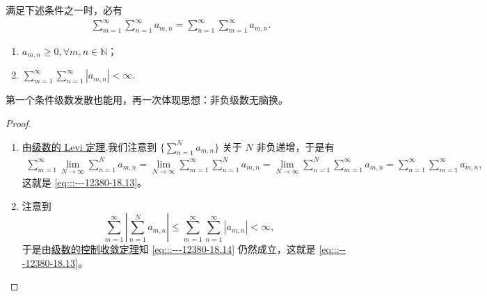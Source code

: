 \documentclass[../../main.tex]{subfiles}%
\begin{document}
\begin{theorem}[级数的Fubini定理]\label{theorem:级数的Fubini定理}满足下述条件之一时，必有
\begin{align}
\sum_{m = 1}^{\infty} \sum_{n = 1}^{\infty} a_{m,n} = \sum_{n = 1}^{\infty} \sum_{m = 1}^{\infty} a_{m,n}. \label{eq:::---12380-18.13}
\end{align}
\begin{enumerate}
\item \( a_{m,n} \geqslant 0, 
\forall m, n \in \mathbb{N} \)；

\item $\sum_{m = 1}^{\infty} \sum_{n = 1}^{\infty} |a_{m,n}| < \infty.$
\end{enumerate}
\end{theorem}
\begin{note}
第一个条件级数发散也能用，再一次体现思想：非负级数无脑换。
\end{note}
\begin{proof}
\begin{enumerate}
\item 由\hyperref[theorem:级数的Levi定理]{级数的 Levi 定理}.我们注意到 \( \{\sum_{n = 1}^{N} a_{m,n} \}\) 关于 \( N \) 非负递增，于是有
\begin{align}
\sum_{m = 1}^{\infty} \lim_{N \to \infty} \sum_{n = 1}^{N} a_{m,n} = \lim_{N \to \infty} \sum_{m = 1}^{\infty} \sum_{n = 1}^{N} a_{m,n} = \lim_{N \to \infty} \sum_{n = 1}^{N} \sum_{m = 1}^{\infty} a_{m,n} = \sum_{n = 1}^{\infty} \sum_{m = 1}^{\infty} a_{m,n}, \label{eq:::---12380-18.14}
\end{align}
这就是 \eqref{eq:::---12380-18.13}。

\item 注意到
\[
\sum_{m = 1}^{\infty} \left| \sum_{n = 1}^{N} a_{m,n} \right| \leqslant \sum_{m = 1}^{\infty} \sum_{n = 1}^{\infty} |a_{m,n}| < \infty,
\]
于是由\hyperref[theorem:级数的控制收敛定理]{级数的控制收敛定理}知 \eqref{eq:::---12380-18.14} 仍然成立，这就是 \eqref{eq:::---12380-18.13}。
\end{enumerate}
\end{proof}
\end{document}
